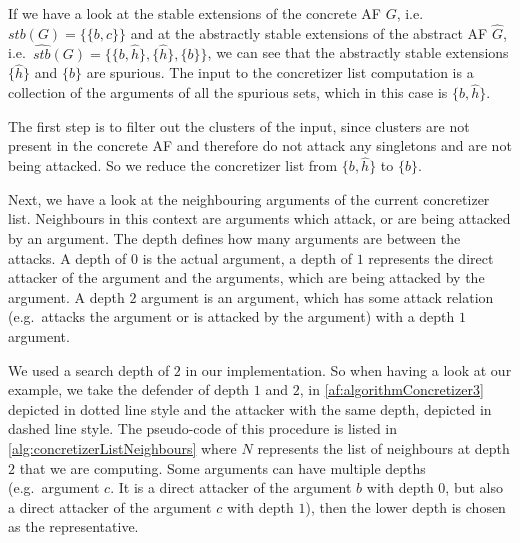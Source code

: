 If we have a look at the stable extensions of the concrete AF $G$, i.e.\ 
$stb(G) = \bigl\{\{b, c\}\bigl\}$ and at the abstractly stable extensions of the abstract AF $\hat{G}$, i.e.\ 
$\hat{stb}(G) = \bigl\{\{b, \hat{h}\}, \{\hat{h}\}, \{b\}\bigl\}$, we can see that the abstractly stable extensions $\{\hat{h}\}$ and $\{b\}$ are spurious. The input to the concretizer list computation is a collection of the arguments of all the spurious sets, which in this case is $\{b, \hat{h}\}$.

The first step is to filter out the clusters of the input, since clusters are not present in the concrete AF and therefore do not attack any singletons and are not being attacked. So we reduce the concretizer list from $\{b, \hat{h}\}$ to $\{b\}$.

Next, we have a look at the neighbouring arguments of the current concretizer list.  Neighbours in this context are arguments which attack, or are being attacked by an argument. The depth defines how many arguments are between the attacks. A depth of $0$ is the actual argument, a depth of $1$ represents the direct attacker of the argument and the arguments, which are being attacked by the argument. A depth $2$ argument is an argument, which has some attack relation (e.g.\ attacks the argument or is attacked by the argument) with a depth $1$ argument.

We used a search depth of $2$ in our implementation. So when having a look at our example, we take the defender of depth $1$ and $2$, in \cref{af:algorithmConcretizer3} depicted in dotted line style and the attacker with the same depth, depicted in dashed line style. The pseudo-code of this procedure is listed in \cref{alg:concretizerListNeighbours} where $N$ represents the list of neighbours at depth $2$ that we are computing. Some arguments can have multiple depths (e.g.\ argument $c$. It is a direct attacker of the argument $b$ with depth $0$, but also a direct attacker of the argument $c$ with depth $1$), then the lower depth is chosen as the representative.

